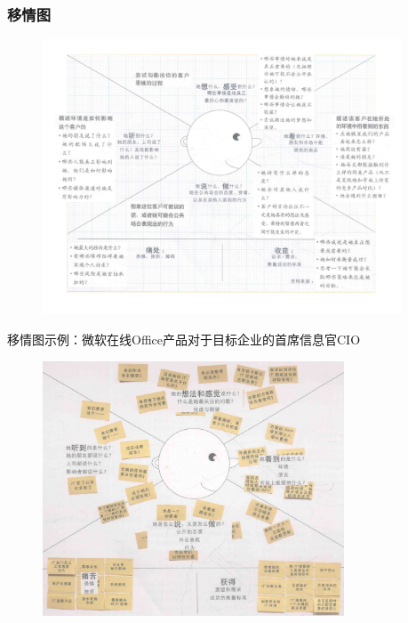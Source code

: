 \subsubsection{移情图}
\begin{figure}[H]
	\centering
	\vspace{-0.5em}
	\includegraphics[width=0.95\textwidth]{img/移情图.pdf}
    \vspace{-1em}
\end{figure}

移情图示例：微软在线Office产品对于目标企业的首席信息官CIO

\begin{figure}[H]
	\centering
	\vspace{-0.5em}
	\includegraphics[width=0.8\textwidth]{img/移情图示例.png}
    \vspace{-0.5em}
\end{figure}


